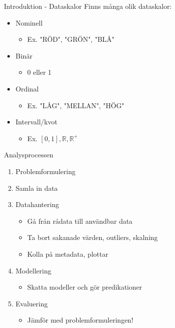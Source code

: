 \documentclass[10pt,english]{beamer}
\begin{document}
\begin{frame}{Introduktion - Dataskalor}
    Finns många olik dataskalor:
    \begin{itemize}
        \item Nominell
        \begin{itemize}
            \item Ex. "RÖD", "GRÖN", "BLÅ"
        \end{itemize}
        \item Binär
        \begin{itemize}
            \item 0 eller 1
        \end{itemize}
        \item Ordinal
        \begin{itemize}
            \item Ex. "LÅG", "MELLAN", "HÖG"
        \end{itemize}
        \item Intervall/kvot
        \begin{itemize}
            \item Ex. $[0,1], \mathbb{R}, \mathbb{R}^{+}$
        \end{itemize}
    \end{itemize}
\end{frame}

\begin{frame}{Analysprocessen}
    \begin{enumerate}
        \item Problemformulering
        \item Samla in data
        \item Datahantering
        \begin{itemize}
            \item Gå från rådata till användbar data
            \item Ta bort sakanade värden, outliers, skalning
            \item Kolla på metadata, plottar
        \end{itemize}
        \item Modellering
        \begin{itemize}
            \item Skatta modeller och gör predikationer
        \end{itemize}
        \item Evaluering
        \begin{itemize}
            \item Jämför med problemformuleringen!
        \end{itemize}
    \end{enumerate}
\end{frame}
\end{document}
